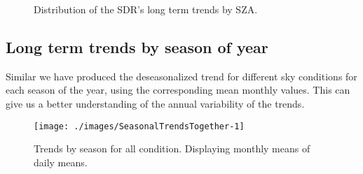\documentclass[preprint, 3p,
authoryear]{elsarticle} %
\begin{document}
\begin{figure}[h!]

{\centering {}

}

\caption{Distribution of the SDR's long term trends by SZA.}\label{fig:szatrends}
\end{figure}

\hypertarget{long-term-trends-by-season-of-year}{%
\subsection{Long term trends by season of
year}\label{long-term-trends-by-season-of-year}}

Similar we have produced the deseasonalized trend for different sky
conditions for each season of the year, using the corresponding mean
monthly values. This can give us a better understanding of the annual
variability of the trends.

\begin{figure}[h!]

{\centering \texttt{[image: ./images/SeasonalTrendsTogether-1]} 

}

\caption{Trends by season for all condition. Displaying monthly means of daily means.}\label{fig:seasonalALL}
\end{figure}
\end{document}
